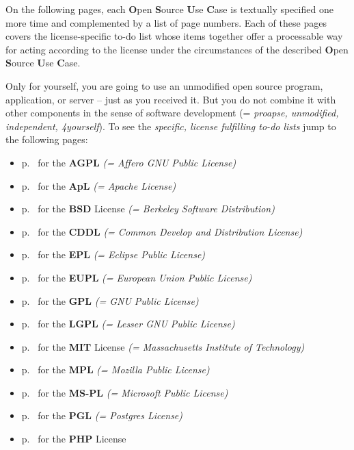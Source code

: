 On the following pages, each \textbf{O}pen \textbf{S}ource \textbf{U}se
\textbf{C}ase is textually specified one more time and complemented by a list of
page numbers. Each of these pages covers the license-specific to-do list whose
items together offer a processable way for acting according to the license under
the circumstances of the described \textbf{O}pen \textbf{S}ource \textbf{U}se
\textbf{C}ase.

\begin{description}
\label{OSUCList}
\item[OSUC-01:]\label{OSUC-01-DEF}
Only for yourself, you are going to use an unmodified open source program,
application, or server -- just as you received it. But you do not combine it
with other components in the sense of software development (= \textit{proapse,
unmodified, independent, 4yourself}).
To see the \textit{specific, license fulfilling to-do lists} jump to the
following pages:
  \begin{itemize}
    \item p.\ \pageref{OSUC-01-AGPL} for the \textbf{AGPL}
      \textit{(= Affero GNU Public License)} 
    \item p.\ \pageref{OSUC-01-Apache20} for the \textbf{ApL}
      \textit{(= Apache License)}
    \item p.\ \pageref{OSUC-01-BSD} for the \textbf{BSD} License
      \textit{(= Berkeley Software Distribution)}
    \item p.\ \pageref{OSUC-01-CDDL} for the \textbf{CDDL}
      \textit{(= Common Develop and Distribution License)}  
    \item p.\ \pageref{OSUC-01-EPL} for the \textbf{EPL}
      \textit{(= Eclipse Public License)}     
    \item p.\ \pageref{OSUC-01-EUPL} for the \textbf{EUPL}
      \textit{(= European Union Public License)} 
    \item p.\ \pageref{OSUC-01-GPL} for the \textbf{GPL}
       \textit{(= GNU Public License)} 
    \item p.\ \pageref{OSUC-01-LGPL} for the \textbf{LGPL}
      \textit{(= Lesser GNU Public License)}           
    \item p.\ \pageref{OSUC-01-MIT} for the \textbf{MIT} License
       \textit{(= Massachusetts Institute of Technology)} 
    \item p.\ \pageref{OSUC-01-MPL} for the \textbf{MPL}
      \textit{(= Mozilla Public License)}     
    \item p.\ \pageref{OSUC-01-MS-PL} for the \textbf{MS-PL}
      \textit{(= Microsoft Public License)} 
    \item p.\ \pageref{OSUC-01-PGL} for the \textbf{PGL}
      \textit{(= Postgres License)} 
    \item p.\ \pageref{OSUC-01-PHP} for the \textbf{PHP} License 
  \end{itemize}


\end{description}
